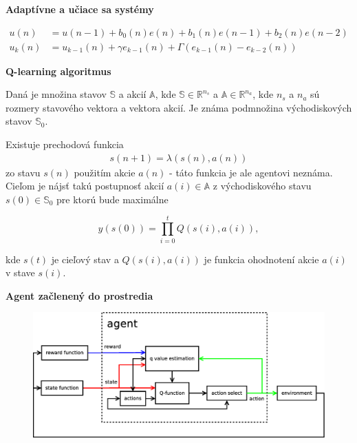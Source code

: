 \documentclass[xcolor=dvipsnames]{beamer}
\begin{document}
\begin{frame}{\bf Adaptívne a učiace sa systémy}
\begin{minipage}{.5\textwidth}
\end{minipage}

\begin{align} \label{eu_eqn}
  u(n) &= u(n-1) + b_0(n)e(n) + b_1(n)e(n-1) + b_2(n)e(n-2) \nonumber \\
  u_{k}(n) &= u_{k-1}(n) + \gamma e_{k-1}(n) + \Gamma (e_{k-1}(n) - e_{k-2}(n)) \nonumber
\end{align}

\end{frame}


\begin{frame}{\bf Q-learning algoritmus}

Daná je množina stavov $\mathbb{S}$ a akcií $\mathbb{A}$, kde
 $\mathbb{S} \in \mathbb{R}^{n_s}$ a $\mathbb{A} \in \mathbb{R}^{n_a}$, kde
$n_s$ a  $n_a$ sú rozmery stavového vektora a vektora akcií. Je známa podmnožina východiskových
stavov $\mathbb{S}_0$.

Existuje prechodová funkcia
\begin{align}
        s(n+1) = \lambda(s(n), a(n))
\end{align}
zo stavu $s(n)$ použitím akcie $a(n)$ - táto funkcia je ale agentovi neznáma.
Cieľom je nájsť takú postupnosť akcií $a(i) \in \mathbb{A}$ z východiskového stavu $s(0) \in \mathbb{S}_0$ pre ktorú bude maximálne

\begin{equation} \label{eu_eqn}
y({s(0)}) = \prod_{i=0}^{t}Q(s(i), a(i)) ,
\end{equation}

kde $s(t)$ je cieľový stav a $Q(s(i), a(i))$ je funkcia ohodnotení akcie $a(i)$ v stave
$s(i)$.



\end{frame}




\begin{frame}{\bf Agent začlenený do prostredia}

\begin{figure}[!htb]
\includegraphics[scale=.3]{../diagrams/q_learning_agent.eps}
\end{figure}

\end{frame}
\end{document}
